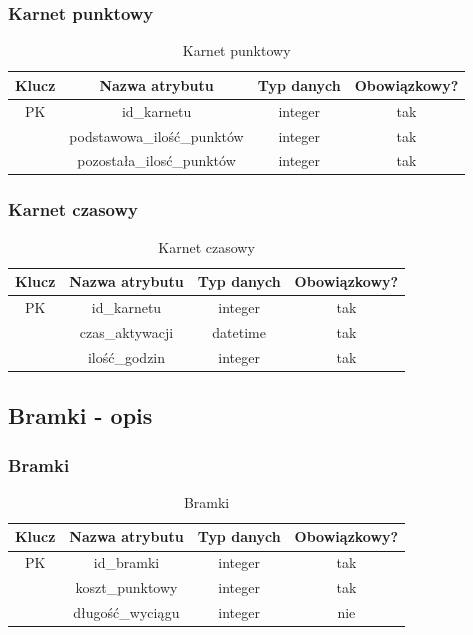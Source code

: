 \documentclass{sprawozdanie-agh}
\begin{document}
\subsubsection{Karnet punktowy}
\begin{table}[H]
	\centering
	\begin{tabular}{|c|c|c|c|}
		\hline
		Klucz & Nazwa atrybutu                & Typ danych & Obowiązkowy? \\ \hline
		PK    & id\_karnetu                   & integer    & tak           \\ \hline
		      & podstawowa\_ilość\_punktów & integer    & tak           \\ \hline
		      & pozostała\_ilosć\_punktów  & integer    & tak           \\ \hline
	\end{tabular}
	\caption{Karnet punktowy}
\end{table}

\subsubsection{Karnet czasowy}
\begin{table}[H]
	\centering
	\begin{tabular}{|c|c|c|c|}
		\hline
		Klucz & Nazwa atrybutu  & Typ danych & Obowiązkowy? \\ \hline
		PK    & id\_karnetu     & integer    & tak           \\ \hline
		      & czas\_aktywacji & datetime   & tak           \\ \hline
		      & ilość\_godzin & integer    & tak           \\ \hline
	\end{tabular}
	\caption{Karnet czasowy}
\end{table}

\subsection{Bramki - opis}
\subsubsection{Bramki}
\begin{table}[H]
	\centering
	\begin{tabular}{|c|c|c|c|}
		\hline
		Klucz & Nazwa atrybutu       & Typ danych & Obowiązkowy? \\ \hline
		PK    & id\_bramki           & integer    & tak           \\ \hline
		      & koszt\_punktowy      & integer    & tak           \\ \hline
		      & długość\_wyciągu & integer    & nie           \\ \hline
	\end{tabular}
	\caption{Bramki}
\end{table}
\end{document}
